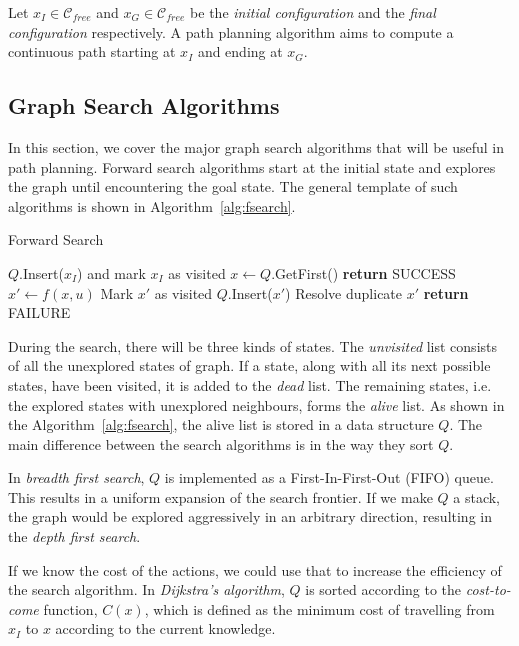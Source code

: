 Let $x_I \in \mathcal{C}_{free}$ and $x_G \in \mathcal{C}_{free}$ be the \textit{initial configuration} and  the \textit{final configuration} respectively. A path planning algorithm aims to compute a continuous path starting at $x_I$ and ending at $x_G$. 

\subsection{Graph Search Algorithms}
In this section, we cover the major graph search algorithms that will be useful in path planning. Forward search algorithms start at the initial state and explores the graph until encountering the goal state. The general template of such algorithms \cite{lavalle2006planning} is shown in Algorithm~\ref{alg:fsearch}.

\begin{algorithm}
\caption{Forward Search}\label{alg:fsearch}
\begin{algorithmic}[1]
\State $Q$.Insert($x_I$) and mark $x_I$ as visited
\State $x\gets Q$.GetFirst()
\State \textbf{return} SUCCESS
\EndIf
{}
\State $x'\gets f(x,u)$
\State Mark $x'$ as visited
\State $Q$.Insert($x'$)
\Else
\State Resolve duplicate $x'$
\EndIf
\EndFor
\EndWhile
\State \textbf{return} FAILURE
\end{algorithmic}
\end{algorithm}

During the search, there will be three kinds of states. The \textit{unvisited} list consists of all the unexplored states of graph. If a state, along with all its next possible states, have been visited, it is added to the \textit{dead} list. The remaining states, i.e. the explored states with unexplored neighbours, forms the \textit{alive} list. As shown in the Algorithm~\ref{alg:fsearch}, the alive list is stored in a data structure $Q$. The main difference between the search algorithms is in the way they sort $Q$. 

In \textit{breadth first search}, $Q$ is implemented as a First-In-First-Out (FIFO) queue. This results in a uniform expansion of the search frontier. If we make $Q$ a stack, the graph would be explored aggressively in an arbitrary direction, resulting in the \textit{depth first search}. 

If we know the cost of the actions, we could use that to increase the efficiency of the search algorithm. In \textit{Dijkstra's algorithm}, $Q$ is sorted according to the \textit{cost-to-come} function, $C(x)$, which is defined as the minimum cost  of travelling from $x_I$ to $x$ according to the current knowledge. 


